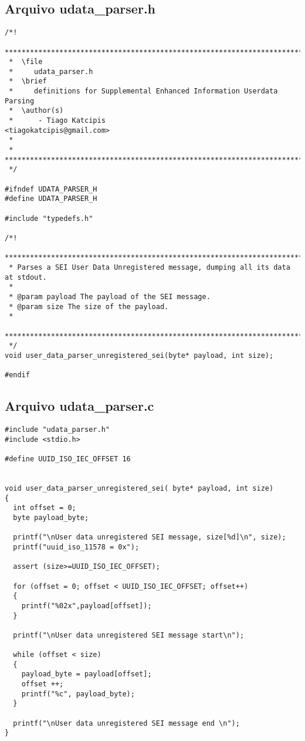 \subsection{Arquivo udata\_parser.h}
\begin{lstlisting}
/*!
 ************************************************************************
 *  \file
 *     udata_parser.h
 *  \brief
 *     definitions for Supplemental Enhanced Information Userdata Parsing
 *  \author(s)
 *      - Tiago Katcipis                             <tiagokatcipis@gmail.com>
 *
 * ************************************************************************
 */

#ifndef UDATA_PARSER_H
#define UDATA_PARSER_H

#include "typedefs.h"

/*!
 *******************************************************************************
 * Parses a SEI User Data Unregistered message, dumping all its data at stdout.
 *
 * @param payload The payload of the SEI message.
 * @param size The size of the payload.
 *
 *******************************************************************************
 */
void user_data_parser_unregistered_sei(byte* payload, int size);

#endif
\end{lstlisting}

\subsection{Arquivo udata\_parser.c}
\begin{lstlisting}
#include "udata_parser.h"
#include <stdio.h>

#define UUID_ISO_IEC_OFFSET 16 


void user_data_parser_unregistered_sei( byte* payload, int size)
{
  int offset = 0;
  byte payload_byte;

  printf("\nUser data unregistered SEI message, size[%d]\n", size);
  printf("uuid_iso_11578 = 0x");
  
  assert (size>=UUID_ISO_IEC_OFFSET);

  for (offset = 0; offset < UUID_ISO_IEC_OFFSET; offset++)
  {
    printf("%02x",payload[offset]);
  }

  printf("\nUser data unregistered SEI message start\n");

  while (offset < size)
  {
    payload_byte = payload[offset];
    offset ++;
    printf("%c", payload_byte);
  }

  printf("\nUser data unregistered SEI message end \n");
}
\end{lstlisting}


